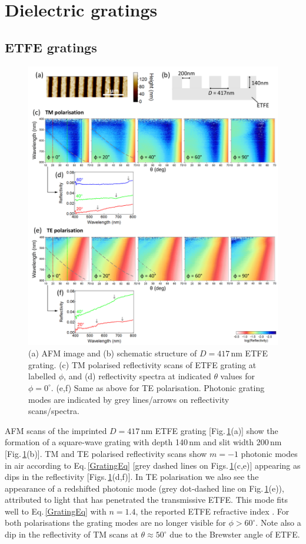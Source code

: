 \section{Dielectric gratings}
\subsection{ETFE gratings}
\begin{figure}[h!] 
\centering    
\includegraphics[width=\textwidth]{Fig2}
\caption[(a) AFM image and (b) schematic structure of $D=417$\,nm ETFE grating. Reflectivity measurements of ETFE grating in (c,d) TM and (e.f) TE polarisation.]{(a) AFM image and (b) schematic structure of $D=417$\,nm ETFE grating. (c) TM polarised reflectivity scans of ETFE grating at labelled $\phi$, and (d) reflectivity spectra at indicated $\theta$ values for $\phi=0^{\circ}$. (e,f) Same as above for TE polarisation. Photonic grating modes are indicated by grey lines/arrows on reflectivity scans/spectra.}
\label{7Fig2}
\end{figure}
AFM scans of the imprinted $D=417$\,nm ETFE grating [Fig.\,\ref{7Fig2}(a)] show the formation of a square-wave grating with depth 140\,nm and slit width 200\,nm [Fig.\,\ref{7Fig2}(b)]. TM and TE polarised reflectivity scans show $m=-1$ photonic modes in air according to Eq.\,\ref{GratingEq} [grey dashed lines on Figs.\,\ref{7Fig2}(c,e)] appearing as dips in the reflectivity [Figs.\,\ref{7Fig2}(d,f)]. In TE polarisation we also see the appearance of a redshifted photonic mode (grey dot-dashed line on Fig.\,\ref{7Fig2}(e)), attributed to light that has penetrated the transmissive ETFE. This mode fits well to Eq.\,\ref{GratingEq} with $n=1.4$, the reported ETFE refractive index \cite{French2011}. For both polarisations the grating modes are no longer visible for $\phi>60^{\circ}$. Note also a dip in the reflectivity of TM scans at $\theta\approx50^{\circ}$ due to the Brewster angle of ETFE.

